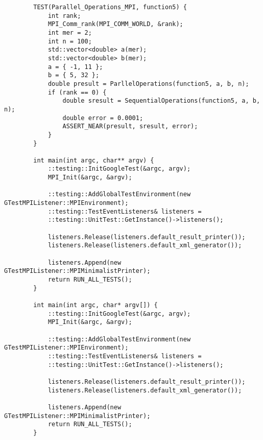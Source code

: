 \documentclass{report}
\begin{document}
\begin{lstlisting}
		TEST(Parallel_Operations_MPI, function5) {
			int rank;
			MPI_Comm_rank(MPI_COMM_WORLD, &rank);
			int mer = 2;
			int n = 100;
			std::vector<double> a(mer);
			std::vector<double> b(mer);
			a = { -1, 11 };
			b = { 5, 32 };
			double presult = ParllelOperations(function5, a, b, n);
			if (rank == 0) {
				double sresult = SequentialOperations(function5, a, b, n);
				double error = 0.0001;
				ASSERT_NEAR(presult, sresult, error);
			}
		}
		
		int main(int argc, char** argv) {
			::testing::InitGoogleTest(&argc, argv);
			MPI_Init(&argc, &argv);
			
			::testing::AddGlobalTestEnvironment(new GTestMPIListener::MPIEnvironment);
			::testing::TestEventListeners& listeners =
			::testing::UnitTest::GetInstance()->listeners();
			
			listeners.Release(listeners.default_result_printer());
			listeners.Release(listeners.default_xml_generator());
			
			listeners.Append(new GTestMPIListener::MPIMinimalistPrinter);
			return RUN_ALL_TESTS();
		}
		
		int main(int argc, char* argv[]) {
			::testing::InitGoogleTest(&argc, argv);
			MPI_Init(&argc, &argv);
			
			::testing::AddGlobalTestEnvironment(new GTestMPIListener::MPIEnvironment);
			::testing::TestEventListeners& listeners =
			::testing::UnitTest::GetInstance()->listeners();
			
			listeners.Release(listeners.default_result_printer());
			listeners.Release(listeners.default_xml_generator());
			
			listeners.Append(new GTestMPIListener::MPIMinimalistPrinter);
			return RUN_ALL_TESTS();
		}
	\end{lstlisting}
\end{document}
